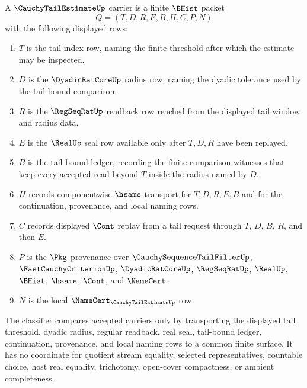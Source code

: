 \begin{definition}
\label{def:cauchy-tail-estimate-carrier}
A $\CauchyTailEstimateUp$ carrier is a finite $\BHist$ packet
$$
Q=(T,D,R,E,B,H,C,P,N)
$$
with the following displayed rows:
\begin{enumerate}
\item $T$ is the tail-index row, naming the finite threshold after which the estimate may be inspected.
\item $D$ is the $\DyadicRatCoreUp$ radius row, naming the dyadic tolerance used by the tail-bound comparison.
\item $R$ is the $\RegSeqRatUp$ readback row reached from the displayed tail window and radius data.
\item $E$ is the $\RealUp$ seal row available only after $T,D,R$ have been replayed.
\item $B$ is the tail-bound ledger, recording the finite comparison witnesses that keep every accepted read beyond $T$ inside the radius named by $D$.
\item $H$ records componentwise $\hsame$ transport for $T,D,R,E,B$ and for the continuation, provenance, and local naming rows.
\item $C$ records displayed $\Cont$ replay from a tail request through $T$, $D$, $B$, $R$, and then $E$.
\item $P$ is the $\Pkg$ provenance over $\CauchySequenceTailFilterUp$, $\FastCauchyCriterionUp$, $\DyadicRatCoreUp$, $\RegSeqRatUp$, $\RealUp$, $\BHist$, $\hsame$, $\Cont$, and $\NameCert$.
\item $N$ is the local $\NameCert_{\CauchyTailEstimateUp}$ row.
\end{enumerate}
The classifier compares accepted carriers only by transporting the displayed tail threshold, dyadic radius, regular readback, real seal, tail-bound ledger, continuation, provenance, and local naming rows to a common finite surface. It has no coordinate for quotient stream equality, selected representatives, countable choice, host real equality, trichotomy, open-cover compactness, or ambient completeness.
\end{definition}

